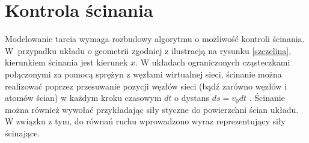 \documentclass[12pt,a4paper,openright]{report} %
\begin{document}
\section{Kontrola ścinania}
\label{shearostat}
%
Modelowanie tarcia wymaga rozbudowy algorytmu o możliwość kontroli ścinania. W~przypadku układu o geometrii zgodniej z ilustracją na rysunku \ref{szczelina}, kierunkiem ścinania jest kierunek $x$. W układach ograniczonych cząsteczkami połączonymi za pomocą sprężyn z węzłami wirtualnej sieci, ścinanie można realizować poprzez przesuwanie pozycji węzłów sieci (bądź zarówno węzłów i atomów ścian) w każdym kroku czasowym $dt$ o dystans $d s=v_0 d t$ \cite{DMH1}. Ścinanie można również wywołać przykładając siły styczne do powierzchni ścian układu. W związku z tym, do równań ruchu wprowadzono wyraz reprezentujący siły ścinające. 

%
\end{document}
